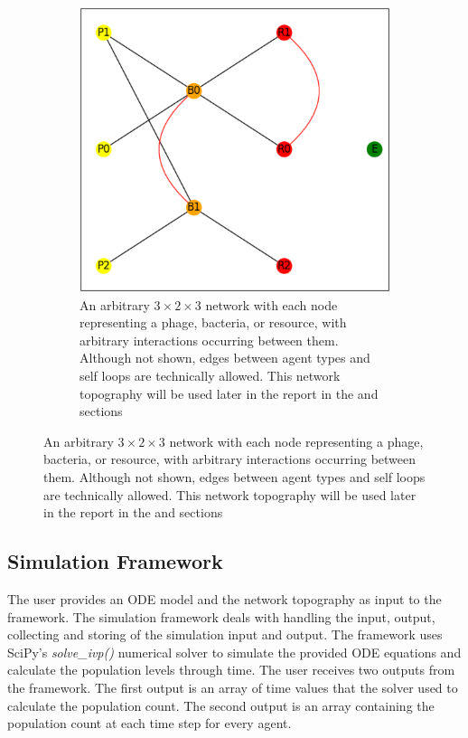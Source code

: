 \begin{figure}
\begin{subfigure}{0.49\linewidth}
        \includegraphics[width=\linewidth]{Screenshots/example_network.png}
        \caption{
            An arbitrary $3\times2\times3$ network with each node representing a phage, bacteria, or resource, with arbitrary interactions occurring between them. 
            Although not shown, edges between agent types and self loops are technically allowed. 
            This network topography will be used later in the report in the  and  sections
        }
        \label{fig:ss:example_network}
    \end{subfigure} 
 \end{figure}

\subsection{Simulation Framework}
\label{sec:simulation_framework}
The user provides an ODE model and the network topography as input to the framework. 
The simulation framework deals with handling the input, output, collecting and storing of the simulation input and output.
The framework uses SciPy's \cite{virtanenSciPy10Fundamental2020} \textit{solve\_ivp()} numerical solver \cite{ dormandFamilyEmbeddedRungeKutta1980} to simulate the provided ODE equations and calculate the population levels through time.
The user receives two outputs from the framework. 
The first output is an array of time values that the solver used to calculate the population count.
The second output is an array containing the population count at each time step for every agent.

